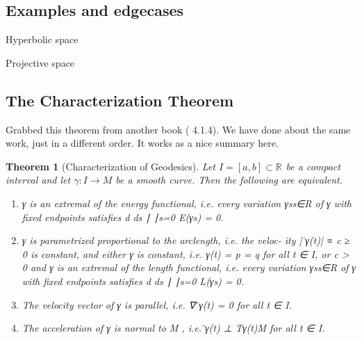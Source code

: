 \documentclass{article}
\newtheorem{thm}{Theorem}
\renewcommand{\Rn}[1][n]{\mathbb{R}^{#1}}
\begin{document}
\subsection{Examples and edgecases}


Hyperbolic space

Projective space



\subsection{The Characterization Theorem}

Grabbed this theorem from another book (\cite{salamon} 4.1.4).
We have done about the same work, just in a different order.
It works as a nice summary here.

\begin{thm}[Characterization of Geodesics]
    Let $I = [a, b] \subset \Rn[]$ be a compact interval and let $\gamma : I \rightarrow M$ be a
    smooth curve. Then the following are equivalent.
    \begin{enumerate}
    \item γ is an extremal of the energy functional, i.e. every variation {γs}s∈R
        of γ with fixed endpoints satisfies
        d
        ds
        ∣
        ∣s=0 E(γs) = 0.
    \item γ is parametrized proportional to the arclength, i.e. the veloc-
        ity |  ̇γ(t)| ≡ c ≥ 0 is constant, and either γ is constant, i.e. γ(t) = p = q for
        all t ∈ I, or c > 0 and γ is an extremal of the length functional, i.e.
        every variation {γs}s∈R of γ with fixed endpoints satisfies
        d
        ds
        ∣
        ∣s=0 L(γs) = 0.
    \item The velocity vector of γ is parallel, i.e. ∇  ̇γ(t) = 0 for all t ∈ I.
    \item The acceleration of γ is normal to M , i.e.  ̈γ(t) ⊥ Tγ(t)M for all t ∈ I.
    \end{enumerate}
\end{thm}





\printbibliography
\end{document}

